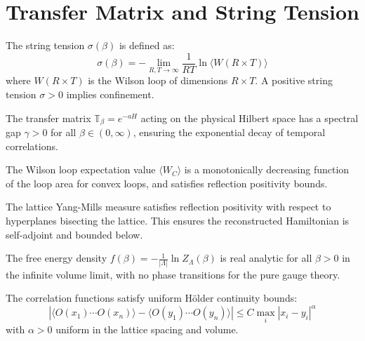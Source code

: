 \section{Transfer Matrix and String Tension}
\label{sec:transfer}

\begin{definition}
\label{def:string-tension}
The string tension $\sigma(\beta)$ is defined as:
\begin{equation}
\sigma(\beta) = -\lim_{R,T \to \infty} \frac{1}{RT} \ln \langle W(R \times T) \rangle
\end{equation}
where $W(R \times T)$ is the Wilson loop of dimensions $R \times T$. A positive string tension $\sigma > 0$ implies confinement.
\end{definition}

\begin{theorem}
\label{thm:transfer-spectral}
\label{thm:transfer-basic}
The transfer matrix $\mathbb{T}_\beta = e^{-a H}$ acting on the physical Hilbert space has a spectral gap $\gamma > 0$ for all $\beta \in (0, \infty)$, ensuring the exponential decay of temporal correlations.
\end{theorem}

\begin{theorem}
\label{thm:wilson-mono}
The Wilson loop expectation value $\langle W_C \rangle$ is a monotonically decreasing function of the loop area for convex loops, and satisfies reflection positivity bounds.
\end{theorem}

\begin{theorem}
\label{thm:rp-positivity}
The lattice Yang-Mills measure satisfies reflection positivity with respect to hyperplanes bisecting the lattice. This ensures the reconstructed Hamiltonian is self-adjoint and bounded below.
\end{theorem}

\begin{theorem}
\label{thm:analyticity}
\label{thm:analyticity-free-energy}
The free energy density $f(\beta) = -\frac{1}{|\Lambda|} \ln Z_\Lambda(\beta)$ is real analytic for all $\beta > 0$ in the infinite volume limit, with no phase transitions for the pure gauge theory.
\end{theorem}

\begin{theorem}
\label{thm:holder-bounds}
The correlation functions satisfy uniform Hölder continuity bounds:
\begin{equation}
|\langle O(x_1) \cdots O(x_n) \rangle - \langle O(y_1) \cdots O(y_n) \rangle| \le C \max_i |x_i - y_i|^\alpha
\end{equation}
with $\alpha > 0$ uniform in the lattice spacing and volume.
\end{theorem}

